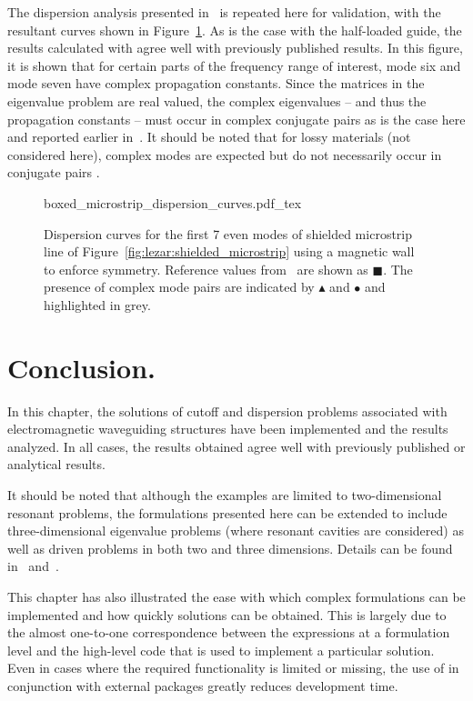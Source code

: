 The dispersion analysis presented in~\citet{PelosiCoccioliSelleri1998}
is repeated here for validation, with the resultant curves shown in
Figure~\ref{fig:lezar:shielded_microstrip_dispersion_curves}. As is the
case with the half-loaded guide, the results calculated with \fenics{}
agree well with previously published results. In this figure, it is shown
that for certain parts of the frequency range of interest, mode six
and mode seven have complex propagation constants. Since the matrices in the
eigenvalue problem are real valued, the complex eigenvalues -- and thus
the propagation constants -- must occur in complex conjugate pairs as
is the case here and reported earlier in~\citet{HuangItoh1988}. It
should be noted that for lossy materials (not considered here),
complex modes are expected but do not necessarily occur in conjugate
pairs \citep{PelosiCoccioliSelleri1998}.
\begin{figure}
 \centering
  \def\svgwidth{\largefig}
    {boxed_microstrip_dispersion_curves.pdf_tex}
 \caption{Dispersion curves for the first 7 even modes of shielded
 microstrip line of Figure~\ref{fig:lezar:shielded_microstrip}
 using a magnetic wall to enforce symmetry. Reference values
 from~\citet{PelosiCoccioliSelleri1998} are shown as $\blacksquare$. The
 presence of complex mode pairs are indicated by $\blacktriangle$ and
 $\bullet$ and highlighted in grey.}
 \label{fig:lezar:shielded_microstrip_dispersion_curves}
\end{figure}
\label{lezar:sec:shielded_microstrip|)}

\section{Conclusion.}

In this chapter, the solutions of cutoff and dispersion problems
associated with electromagnetic waveguiding structures have been
implemented and the results analyzed. In all cases, the results obtained
agree well with previously published or analytical results.

It should be noted that although the examples are limited to
two-dimensional resonant problems, the formulations presented here can
be extended to include three-dimensional eigenvalue problems (where
resonant cavities are considered) as well as driven problems in both
two and three dimensions. Details can be found in~\citet{Jin2002}
and~\citet{PelosiCoccioliSelleri1998}.

This chapter has also illustrated the ease with which complex formulations
can be implemented and how quickly solutions can be obtained. This
is largely due to the almost one-to-one correspondence between the
expressions at a formulation level and the high-level \fenics{} code
that is used to implement a particular solution. Even in cases where
the required functionality is limited or missing, the use of \fenics{}
in conjunction with external packages greatly reduces development time.

